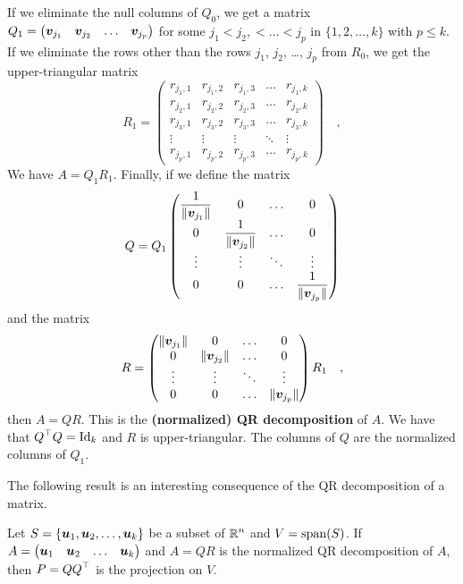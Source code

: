 If we eliminate the null columns of $Q_0$, we get a  matrix
$Q_1 = \begin{pmatrix} \bm{v}_{j_1} & \bm{v}_{j_2} & \ldots &
  \bm{v}_{j_p} \end{pmatrix}$ for some $j_1 < j_2, < \ldots < j_p$ in
$\{1,2,\ldots, k\}$ with $p \leq k$.   If we eliminate the rows other
than the rows $j_1$, $j_2$, \ldots, $j_p$ from $R_0$, we get the
 upper-triangular matrix
\[
R_1 =
\begin{pmatrix}
r_{j_1,1} & r_{j_1,2} & r_{j_1,3} & \ldots & r_{j_1,k} \\
r_{j_2,1} & r_{j_2,2} & r_{j_2,3} & \ldots & r_{j_2,k} \\
r_{j_3,1} & r_{j_3,2} & r_{j_3,3} & \ldots & r_{j_3,k} \\
\vdots & \vdots & \vdots & \ddots & \vdots \\
r_{j_p,1} & r_{j_p,2} & r_{j_p,3} & \ldots & r_{j_p,k}
\end{pmatrix} \quad ,
\]
We have $A = Q_1 R_1$.  Finally, if we define the  matrix
\[
Q = Q_1 \begin{pmatrix}
\displaystyle \frac{1}{\|\bm{v}_{j_1}\|} & 0 & \ldots & 0 \\
0 & \displaystyle \frac{1}{\|\bm{v}_{j_2}\|} &\ldots & 0 \\
\vdots & \vdots & \ddots & \vdots \\
0 & 0 & \ldots & \displaystyle \frac{1}{\|\bm{v}_{j_p}\|}
\end{pmatrix}
\]
and the  matrix
\[
R = \begin{pmatrix}
\|\bm{v}_{j_1}\| & 0 & \ldots & 0 \\
0 & \|\bm{v}_{j_2}\| &\ldots & 0 \\
\vdots & \vdots & \ddots & \vdots \\
0 & 0 & \ldots & \|\bm{v}_{j_p}\|
\end{pmatrix} R_1 \quad ,
\]
then $A = QR$.  This is the
{\bfseries (normalized) QR decomposition}
of $A$.  We have that $\displaystyle Q^\top Q = \operatorname{Id}_k$ and $R$ is
upper-triangular.  The columns of $Q$ are the normalized columns of $Q_1$.

The following result is an interesting consequence of the QR
decomposition of a matrix.

\begin{prop}
Let $S = \{\bm{u}_1, \bm{u}_2, \ldots, \bm{u}_k\}$ be a subset of
$\displaystyle \mathbb{R}^n$ and $V = \operatorname{span}(S)$.  If
$A = \begin{pmatrix} \bm{u}_1 & \bm{u}_2 & \ldots & \bm{u}_k\end{pmatrix}$
and $A = QR$ is the normalized QR decomposition of $A$, then
$\displaystyle P = Q Q^\top$ is the projection on $V$.
\end{prop}

